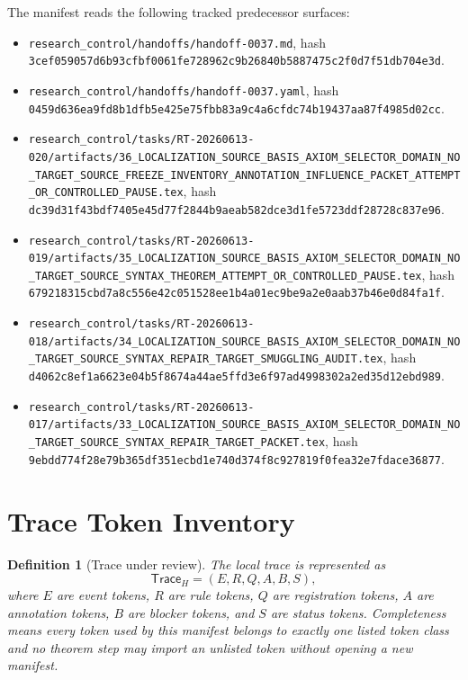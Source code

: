 \documentclass[11pt]{article}
\newcommand{\TraceH}{\mathsf{Trace}_{H}}
\newtheorem{definitionblock}{Definition}
\begin{document}
The manifest reads the following tracked predecessor surfaces:
\begin{itemize}
    \item \verb|research_control/handoffs/handoff-0037.md|,
    hash \texttt{3cef059057d6b93cfbf0061fe728962c9b26840b5887475c2f0d7f51db704e3d}.
    \item \verb|research_control/handoffs/handoff-0037.yaml|,
    hash \texttt{0459d636ea9fd8b1dfb5e425e75fbb83a9c4a6cfdc74b19437aa87f4985d02cc}.
    \item \verb|research_control/tasks/RT-20260613-020/artifacts/36_LOCALIZATION_SOURCE_BASIS_AXIOM_SELECTOR_DOMAIN_NO_TARGET_SOURCE_FREEZE_INVENTORY_ANNOTATION_INFLUENCE_PACKET_ATTEMPT_OR_CONTROLLED_PAUSE.tex|,
    hash \texttt{dc39d31f43bdf7405e45d77f2844b9aeab582dce3d1fe5723ddf28728c837e96}.
    \item \verb|research_control/tasks/RT-20260613-019/artifacts/35_LOCALIZATION_SOURCE_BASIS_AXIOM_SELECTOR_DOMAIN_NO_TARGET_SOURCE_SYNTAX_THEOREM_ATTEMPT_OR_CONTROLLED_PAUSE.tex|,
    hash \texttt{679218315cbd7a8c556e42c051528ee1b4a01ec9be9a2e0aab37b46e0d84fa1f}.
    \item \verb|research_control/tasks/RT-20260613-018/artifacts/34_LOCALIZATION_SOURCE_BASIS_AXIOM_SELECTOR_DOMAIN_NO_TARGET_SOURCE_SYNTAX_REPAIR_TARGET_SMUGGLING_AUDIT.tex|,
    hash \texttt{d4062c8ef1a6623e04b5f8674a44ae5ffd3e6f97ad4998302a2ed35d12ebd989}.
    \item \verb|research_control/tasks/RT-20260613-017/artifacts/33_LOCALIZATION_SOURCE_BASIS_AXIOM_SELECTOR_DOMAIN_NO_TARGET_SOURCE_SYNTAX_REPAIR_TARGET_PACKET.tex|,
    hash \texttt{9ebdd774f28e79b365df351ecbd1e740d374f8c927819f0fea32e7fdace36877}.
\end{itemize}

\section{Trace Token Inventory}

\begin{definitionblock}[Trace under review]
The local trace is represented as
\[
    \TraceH=(E,R,Q,A,B,S),
\]
where \(E\) are event tokens, \(R\) are rule tokens, \(Q\) are registration
tokens, \(A\) are annotation tokens, \(B\) are blocker tokens, and \(S\) are
status tokens. Completeness means every token used by this manifest belongs
to exactly one listed token class and no theorem step may import an unlisted
token without opening a new manifest.
\end{definitionblock}
\end{document}
